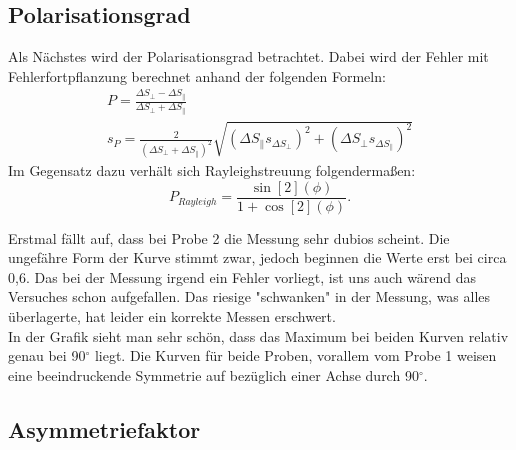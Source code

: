 
\subsection*{Polarisationsgrad}

Als Nächstes wird der Polarisationsgrad betrachtet. Dabei wird der Fehler mit Fehlerfortpflanzung berechnet anhand der folgenden Formeln:
\begin{gather}
    P = \frac{\Delta S_{\perp}-\Delta S_{\parallel}}{\Delta S_{\perp} + \Delta S_{\parallel}}\\
    s_P = \frac{2}{(\Delta S_{\perp} + \Delta S_{\parallel})^2}\sqrt{(\Delta S_{\parallel} s_{\Delta S_{\perp}})^2+ (\Delta S_{\perp} s_{\Delta S_{\parallel}})^2}
\end{gather}
Im Gegensatz dazu verhält sich Rayleighstreuung folgendermaßen:
\begin{equation*}
    P_{Rayleigh} = \frac{\sin[2](\phi)}{1+ \cos[2](\phi)}.
\end{equation*}

Erstmal fällt auf, dass bei Probe 2 die Messung sehr dubios scheint. Die ungefähre Form der Kurve 
stimmt zwar, jedoch beginnen die Werte erst bei circa 0,6. Das bei der Messung irgend ein Fehler vorliegt, ist uns auch wärend das Versuches schon aufgefallen. Das 
riesige "schwanken" in der Messung, was alles überlagerte, hat leider ein korrekte Messen erschwert.\\
In der Grafik sieht man sehr schön, dass das Maximum bei beiden Kurven relativ genau bei 90$^{\circ}$ liegt. Die Kurven für beide Proben, vorallem vom Probe 1 
weisen eine beeindruckende Symmetrie auf bezüglich einer Achse durch 90$^{\circ}$.

\subsection*{Asymmetriefaktor}


